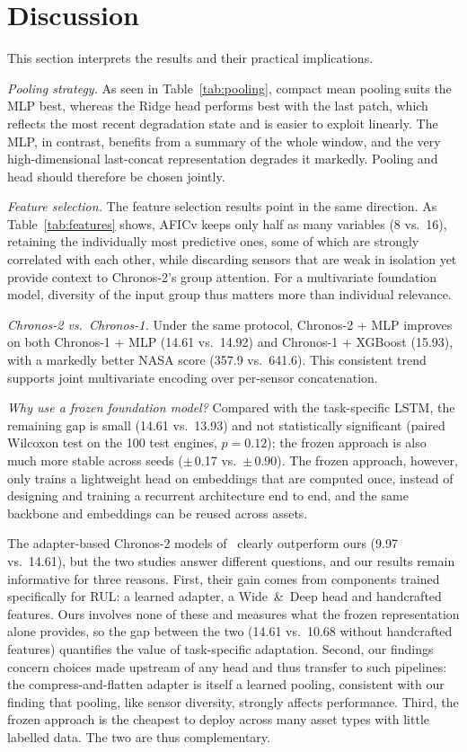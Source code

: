 \documentclass{svproc}
\begin{document}
\section{Discussion}

This section interprets the results and their practical implications.

\textit{Pooling strategy.} As seen in Table~\ref{tab:pooling}, compact
mean pooling suits the MLP best, whereas the Ridge head performs best with
the last patch, which reflects the most recent degradation state and is
easier to exploit linearly. The MLP, in contrast, benefits from a summary
of the whole window, and the very high-dimensional last-concat
representation degrades it markedly. Pooling and head should therefore be
chosen jointly.

\textit{Feature selection.} The feature selection results point in the
same direction. As Table~\ref{tab:features} shows, AFICv keeps only
half as many variables (8 vs.\ 16), retaining the individually most
predictive ones, some of which are strongly correlated with each other,
while discarding sensors that are weak in isolation yet provide context
to Chronos-2's group attention. For a multivariate foundation model,
diversity of the input group thus matters more than individual relevance.

\textit{Chronos-2 vs.\ Chronos-1.} Under the same protocol, Chronos-2 +
MLP improves on both Chronos-1 + MLP (14.61 vs.\ 14.92) and Chronos-1 +
XGBoost (15.93), with a markedly better NASA score (357.9 vs.\ 641.6).
This consistent trend supports joint multivariate encoding over
per-sensor concatenation.

\textit{Why use a frozen foundation model?} Compared with the
task-specific LSTM, the remaining gap is small (14.61 vs.\ 13.93) and
not statistically significant (paired Wilcoxon test on the 100 test
engines, $p = 0.12$); the frozen approach is also much more
stable across seeds ($\pm$\,0.17 vs.\ $\pm$\,0.90). The
frozen approach, however, only trains a lightweight head on embeddings
that are computed once, instead of designing and training a recurrent
architecture end to end, and the same backbone and embeddings can be
reused across assets.

The adapter-based Chronos-2 models of~\cite{abdouni2026} clearly
outperform ours (9.97 vs.\ 14.61), but the two studies answer different
questions, and our results remain informative for three reasons. First,
their gain comes from components trained specifically for RUL: a learned
adapter, a Wide~\&~Deep head and handcrafted features. Ours involves none of
these and measures what the frozen representation alone provides, so the
gap between the two (14.61 vs.\ 10.68 without handcrafted features)
quantifies the value of task-specific adaptation. Second, our findings concern choices made
upstream of any head and thus transfer to such pipelines: the
compress-and-flatten adapter is itself a learned pooling, consistent with our
finding that pooling, like sensor diversity, strongly affects
performance. Third, the frozen approach is the cheapest to deploy across many
asset types with little labelled data. The two are thus complementary.
\end{document}
